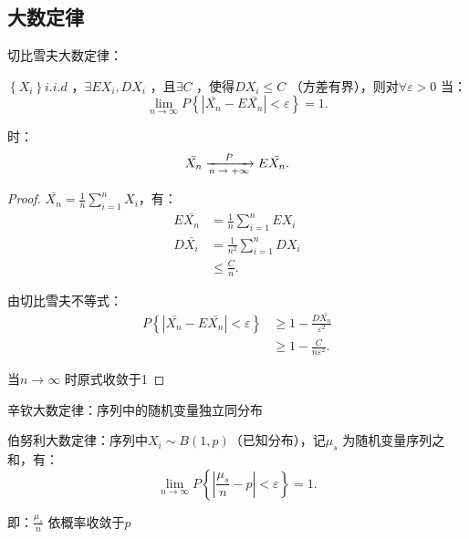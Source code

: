 \subsection{大数定律}%
\label{sub:大数定律}
\begin{notation}
    切比雪夫大数定律：
\end{notation}

\begin{defi}
    $\left\{ X_i \right\} i.i.d$ ，$\exists EX_i,DX_i$ ，且$\exists C$ ，使得$DX_i\le C$ （方差有界），则对$\forall \varepsilon>0$ 当：
    \[
        \lim_{n \to \infty} P\left\{ \left| \bar{X_n}-E\bar{X_n} \right| <\varepsilon \right\} =1
    .\] 

    时：
    \[
        \bar{X_n}\ce{->[$P$][$n\to +\infty $]}E\bar{X_n}
    .\] 
\end{defi}
\begin{proof}
    $\bar{X_n}={\frac{1}{n} \sum_{i=1}^{n} X_i}$，有：
    \begin{align*}
        E\bar{X_n}&=\frac{1}{n} \sum_{i=1}^{n} EX_i\\
        D\bar{X_i}&=\frac{1}{n^2} \sum_{i=1}^{n} DX_i\\
                  &\le \frac{C}{n}
    .\end{align*}

    由切比雪夫不等式：
    \begin{align*}
        P\left\{ \left| \bar{X_n}-E\bar{X_n} \right| <\varepsilon \right\} &\ge 1-\frac{D\bar{X_n}}{\varepsilon^2}\\
                                                                        &\ge 1-\frac{C}{n\varepsilon^2}
    .\end{align*}

    当$n\to \infty $ 时原式收敛于1
\end{proof}
\begin{notation}
    辛钦大数定律：序列中的随机变量独立同分布
\end{notation}
\begin{notation}
    伯努利大数定律：序列中$X_i\sim B\left( 1,p \right) $（已知分布），记$\mu_s$ 为随机变量序列之和，有：
    \[
        \lim_{n \to \infty} P\left\{ \left| \frac{\mu_s}{n} -p  \right| <\varepsilon \right\} =1
    .\] 
    
    即：${\frac{\mu_s}{n}} $ 依概率收敛于$p$
\end{notation}
